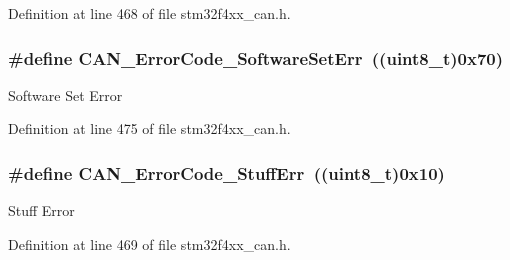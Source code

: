 Definition at line 468 of file stm32f4xx\-\_\-can.\-h.

\hypertarget{group___c_a_n___error___code__constants_ga927089dd74347b9fea7a7c59f3840a7c}{
\subsubsection[{C\-A\-N\-\_\-\-Error\-Code\-\_\-\-Software\-Set\-Err}]{\setlength{\rightskip}{0pt plus 5cm}\#define C\-A\-N\-\_\-\-Error\-Code\-\_\-\-Software\-Set\-Err~((uint8\-\_\-t)0x70)}}\label{group___c_a_n___error___code__constants_ga927089dd74347b9fea7a7c59f3840a7c}
Software Set Error 

Definition at line 475 of file stm32f4xx\-\_\-can.\-h.

\hypertarget{group___c_a_n___error___code__constants_gaa733d1c078472912c3bf60fbdc53734d}{
\subsubsection[{C\-A\-N\-\_\-\-Error\-Code\-\_\-\-Stuff\-Err}]{\setlength{\rightskip}{0pt plus 5cm}\#define C\-A\-N\-\_\-\-Error\-Code\-\_\-\-Stuff\-Err~((uint8\-\_\-t)0x10)}}\label{group___c_a_n___error___code__constants_gaa733d1c078472912c3bf60fbdc53734d}
Stuff Error 

Definition at line 469 of file stm32f4xx\-\_\-can.\-h.


